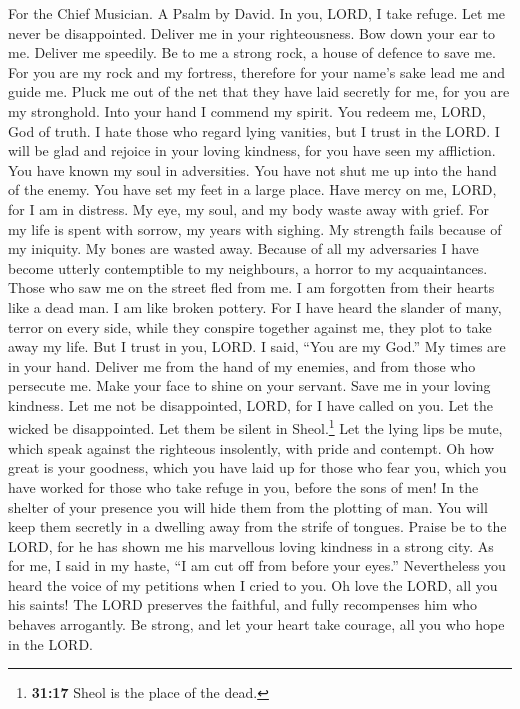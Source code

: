 For the Chief Musician. A Psalm by David.  In you, LORD, I
take refuge. Let me never be disappointed. Deliver me in your
righteousness.  Bow down your ear to me. Deliver me
speedily. Be to me a strong rock, a house of defence to save me.
 For you are my rock and my fortress, therefore for your
name's sake lead me and guide me.  Pluck me out of the net
that they have laid secretly for me, for you are my stronghold.
 Into your hand I commend my spirit. You redeem me, LORD,
God of truth.  I hate those who regard lying vanities, but
I trust in the LORD.  I will be glad and rejoice in your
loving kindness, for you have seen my affliction. You have known my soul
in adversities.  You have not shut me up into the hand of
the enemy. You have set my feet in a large place.  Have
mercy on me, LORD, for I am in distress. My eye, my soul, and my body
waste away with grief.  For my life is spent with sorrow,
my years with sighing. My strength fails because of my iniquity. My
bones are wasted away.  Because of all my adversaries I
have become utterly contemptible to my neighbours, a horror to my
acquaintances. Those who saw me on the street fled from me.
 I am forgotten from their hearts like a dead man. I am
like broken pottery.  For I have heard the slander of
many, terror on every side, while they conspire together against me,
they plot to take away my life.  But I trust in you,
LORD. I said, ``You are my God.''  My times are in your
hand. Deliver me from the hand of my enemies, and from those who
persecute me.  Make your face to shine on your servant.
Save me in your loving kindness.  Let me not be
disappointed, LORD, for I have called on you. Let the wicked be
disappointed. Let them be silent in Sheol.\footnote{\textbf{31:17} Sheol
  is the place of the dead.}  Let the lying lips be mute,
which speak against the righteous insolently, with pride and contempt.
 Oh how great is your goodness, which you have laid up
for those who fear you, which you have worked for those who take refuge
in you, before the sons of men!  In the shelter of your
presence you will hide them from the plotting of man. You will keep them
secretly in a dwelling away from the strife of tongues. 
Praise be to the LORD, for he has shown me his marvellous loving
kindness in a strong city.  As for me, I said in my
haste, ``I am cut off from before your eyes.'' Nevertheless you heard
the voice of my petitions when I cried to you.  Oh love
the LORD, all you his saints! The LORD preserves the faithful, and fully
recompenses him who behaves arrogantly.  Be strong, and
let your heart take courage, all you who hope in the LORD.

